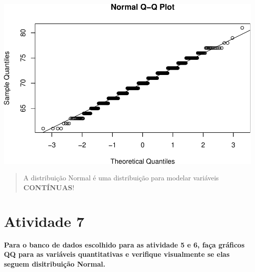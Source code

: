 \documentclass[
]{book}
\begin{document}
\includegraphics{Livro-Estatistica+R_files/figure-latex/unnamed-chunk-33-2.pdf}

\begin{quote}
A distribuição Normal é uma distribuição para modelar variáveis \textbf{CONTÍNUAS}!
\end{quote}

\section{Atividade 7}\label{atividade-7}

\textbf{Para o banco de dados escolhido para as atividade 5 e 6, faça gráficos QQ para as variáveis quantitativas e verifique visualmente se elas seguem disitribuição Normal.}

  
\end{document}
